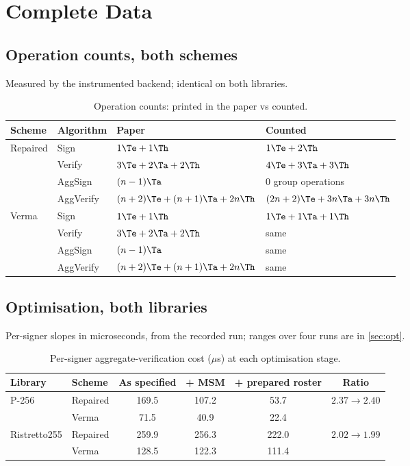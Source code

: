 \section{Complete Data}\label{app:data}

\subsection{Operation counts, both schemes}
Measured by the instrumented backend; identical on both libraries.

\begin{table}[ht]
\centering\small
\caption{Operation counts: printed in the paper vs counted.}\label{tab:counts-full}
\begin{tabular}{llll}
\toprule
Scheme & Algorithm & Paper & Counted \\
\midrule
\multirow{4}{*}{Repaired} & \textsf{Sign} & $1\Te+1\Th$ & $1\Te+2\Th$ \\
 & \textsf{Verify} & $3\Te+2\Ta+2\Th$ & $4\Te+3\Ta+3\Th$ \\
 & \textsf{AggSign} & $(n-1)\Ta$ & 0 group operations \\
 & \textsf{AggVerify} & $(n+2)\Te+(n+1)\Ta+2n\Th$ & $(2n+2)\Te+3n\Ta+3n\Th$ \\
\midrule
\multirow{4}{*}{Verma} & \textsf{Sign} & $1\Te+1\Th$ & $1\Te+1\Ta+1\Th$ \\
 & \textsf{Verify} & $3\Te+2\Ta+2\Th$ & same \\
 & \textsf{AggSign} & $(n-1)\Ta$ & same \\
 & \textsf{AggVerify} & $(n+2)\Te+(n+1)\Ta+2n\Th$ & same \\
\bottomrule
\end{tabular}
\end{table}

\subsection{Optimisation, both libraries}
Per-signer slopes in microseconds, from the recorded run; ranges over four runs are in \cref{sec:opt}.

\begin{table}[ht]
\centering\small
\caption{Per-signer aggregate-verification cost ($\mu$s) at each optimisation stage.}\label{tab:opt-detail}
\begin{tabular}{llcccc}
\toprule
Library & Scheme & As specified & + MSM & + prepared roster & Ratio \\
\midrule
\multirow{2}{*}{P-256} & Repaired & 169.5 & 107.2 & 53.7 & \multirow{2}{*}{$2.37\to2.40$} \\
 & Verma & 71.5 & 40.9 & 22.4 & \\
\midrule
\multirow{2}{*}{Ristretto255} & Repaired & 259.9 & 256.3 & 222.0 & \multirow{2}{*}{$2.02\to1.99$} \\
 & Verma & 128.5 & 122.3 & 111.4 & \\
\bottomrule
\end{tabular}
\end{table}

